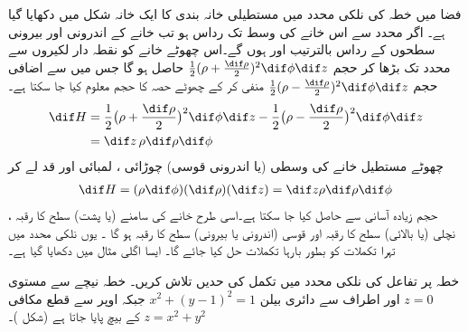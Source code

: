 فضا میں خطہ کی نلکی محدد  میں مستطیلی خانہ بندی کا   ایک خانہ  شکل  میں دکھایا گیا ہے۔ اگر  محدد سے اس خانے کی وسط تک رداس  ہو تب خانے کے اندرونی اور بیرونی سطحوں کے رداس  بالترتیب  اور  ہوں گے۔اس چھوٹے   خانے کو نقطہ دار لکیروں سے    محدد تک بڑھا کر
  حجم 
\(\tfrac{1}{2}(\rho+\tfrac{\dif\rho}{2})^2\dif\phi\dif z\)
 حاصل ہو گا جس میں  سے اضافی حجم  
\(\tfrac{1}{2}(\rho-\tfrac{\dif\rho}{2})^2\dif\phi\dif z\)
 منفی کر کے چھوٹے حصہ کا حجم معلوم کیا جا سکتا ہے۔
\begin {align*}
\dif H &=\frac{1}{2}\big(\rho+\frac{\dif \rho}{2}\big)^2\dif\phi\dif z-\frac{1}{2}\big(\rho-\frac{\dif \rho}{2}\big)^2\dif\phi\dif z \\
&= \dif z \,\rho \dif \rho \dif \phi
\end {align*}
چھوٹے  مستطیل  خانے کی وسطی (یا اندرونی قوسی) چوڑائی ، لمبائی  اور قد  لے  کر  
\begin{align*}
\dif H=(\rho\dif\phi)(\dif\rho)(\dif z)=\dif z\rho\dif \rho\dif\phi
\end{align*}
حجم  زیادہ  آسانی سے حاصل کیا جا سکتا ہے۔اسی طرح خانے کی سامنے (یا پشت) سطح کا رقبہ ، نچلی (یا بالائی) سطح   کا رقبہ  اور قوسی  (اندرونی یا بیرونی) سطح کا رقبہ    ہو   گا ۔ یوں  نلکی محدد میں تہرا تکملات کو  بطور بارہا تکملات حل کیا جائے گا۔ ایسا  اگلی مثال 
میں دکھایا گیا ہے۔


خطہ  پر تفاعل   کی نلکی محدد میں تکمل  کی حدیں تلاش کریں۔ خطہ  نیچے سے مستوی  
\(z=0\)
اور اطراف سے دائری بیلن
\(x^2+(y-1)^2=1\)
 جبکہ اوپر سے قطع مکافی
\(z=x^2+y^2\)
 کے بیچ پایا جاتا ہے (شکل )۔


